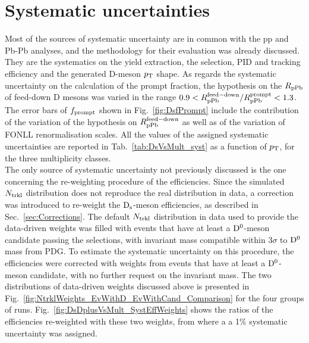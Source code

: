 \section {Systematic uncertainties}
\label{sec:systpA}
Most of the sources of systematic uncertainty are in common with 
the pp and Pb-Pb analyses, and the methodology for their evaluation was 
already discussed. They are the systematics on the yield extraction, 
the selection, PID and tracking efficiency and the generated D-meson $p_{\rm T}$ shape.
As regards the systematic uncertainty on the calculation of the prompt 
fraction, the hypothesis on the $R_{\rm pPb}$ of feed-down D mesons 
was varied in the range $0.9 <R_{\rm pPb}^{\rm feed-down}/R_{\rm pPb}^{\rm prompt} < 1.3$.
The error bars of $f_{\rm prompt}$ shown in Fig.~\ref{fig:DsfPrompt} include the
contribution of the variation of the hypothesis on $R_{\rm pPb}^{\rm feed-down}$ 
as well as of the variation of FONLL renormalisation scales. 
All the values of the assigned systematic uncertainties are reported
in Tab.~\ref{tab:DsVsMult_syst} as a function of $p_{\rm T}$, for the 
three multiplicity classes. \\


The only source of systematic uncertainty not previously discussed 
is the one concerning the re-weighting procedure of the efficiencies.  
Since the simulated $N_{\rm trkl}$ distribution does not reproduce the real distribution in data, 
a correction was introduced to re-weight the ${\rm D_s}$-meson efficiencies, as described 
in Sec.~\ref{sec:Corrections}. 
The default $N_{\rm trkl}$ distribution in data used to provide the data-driven weights
was filled with events that have at least a ${\rm D^0}$-meson candidate
passing the selections, with invariant mass compatible within 3$\sigma$ to ${\rm D^0}$ mass from PDG.
To estimate the systematic uncertainty on this procedure,
the efficiencies were corrected with weights from events that have at 
least a ${\rm D^0}$-meson candidate, with no further request on the invariant mass. 
The two distributions of data-driven weights discussed above is presented in Fig.~\ref{fig:NtrklWeights_EvWithD_EvWithCand_Comparison} for the four groups of runs. 
Fig.~\ref{fig:DsDplusVsMult_SystEffWeights} shows the ratios of the efficiencies re-weighted 
with these two weights, from where a
a 1\% systematic uncertainty was assigned.\\

